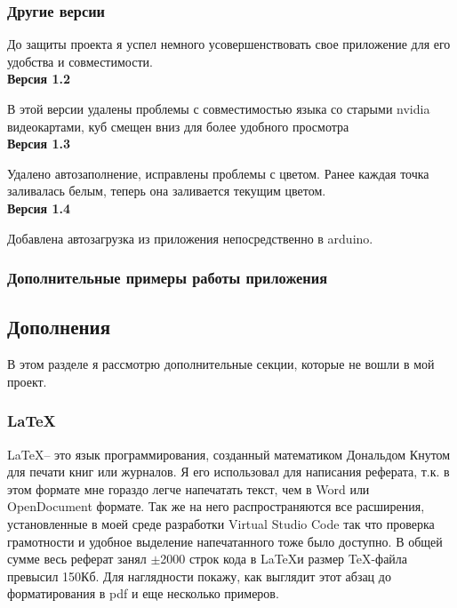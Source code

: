 \documentclass[a4paper, 12pt]{article}
\begin{document}
\subsubsection{Другие версии}

До защиты проекта я успел немного усовершенствовать свое приложение для его 
удобства и совместимости.\\
\textbf{Версия 1.2}

В этой версии удалены проблемы с совместимостью языка со старыми nvidia
видеокартами, куб смещен вниз для более удобного просмотра\\
\textbf{Версия 1.3}

Удалено автозаполнение, исправлены проблемы с цветом. Ранее каждая точка 
заливалась белым, теперь она заливается текущим цветом.\\
\textbf{Версия 1.4}

Добавлена автозагрузка из приложения непосредственно в arduino.
\subsubsection{Дополнительные примеры работы приложения}


\newpage

\subsection{Дополнения}

В этом разделе я рассмотрю дополнительные секции, которые не вошли в мой 
проект. 

\subsubsection{\LaTeX}

\LaTeX -- это язык программирования, созданный математиком Дональдом Кнутом для
печати книг или журналов. Я его использовал для написания реферата, т.к. в этом
формате мне гораздо легче напечатать текст, чем в Word или OpenDocument 
формате. Так же на него распространяются все расширения, установленные в моей
среде разработки Virtual Studio Code так что проверка грамотности и удобное 
выделение напечатанного тоже было доступно. В общей сумме весь реферат занял 
$\pm$2000 строк кода в \LaTeX и размер \TeX-файла превысил 150Кб. Для 
наглядности покажу, как выглядит этот абзац до форматирования в pdf и еще 
несколько примеров.

\end{document}
